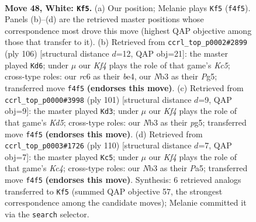 \documentclass[11pt]{article}
\begin{document}
\clearpage

\begin{figure}[p]\centering
\begin{subfigure}{0.46\textwidth}\centering
\resizebox{\linewidth}{!}{%
\newchessgame
\chessboard[
  setfen={5k2/2P5/2r5/4B3/5K2/1N6/8/8 w - - 9 48},
  showmover=false,
  pgfstyle=straightmove, color=movearrow, markmove={f4-f5}
]}
\caption{}
\end{subfigure}\hfill
\begin{subfigure}{0.46\textwidth}\centering
\resizebox{\linewidth}{!}{%
\newchessgame
\chessboard[
  setfen={4k3/8/8/2KP2P1/3Bb3/8/8/8 w - - 5 54},
  showmover=false,
  pgfstyle=straightmove, color=movearrow, markmove={c5-d6}
]}
\caption{}
\end{subfigure}
\\[4pt]
\begin{subfigure}{0.46\textwidth}\centering
\resizebox{\linewidth}{!}{%
\newchessgame
\chessboard[
  setfen={8/8/8/4b1P1/3kp2R/1K6/8/8 b - - 0 51},
  showmover=false,
  pgfstyle=straightmove, color=movearrow, markmove={d4-d3}
]}
\caption{}
\end{subfigure}\hfill
\begin{subfigure}{0.46\textwidth}\centering
\resizebox{\linewidth}{!}{%
\newchessgame
\chessboard[
  setfen={1k6/8/8/PP1B4/2K5/8/8/1r6 w - - 3 56},
  showmover=false,
  pgfstyle=straightmove, color=movearrow, markmove={c4-c5}
]}
\caption{}
\end{subfigure}
\caption{\textbf{Move 48, White: \texttt{Kf5}.} (a) Our position; Melanie plays \texttt{Kf5} (\texttt{f4f5}). Panels (b)--(d) are the retrieved master positions whose correspondence most drove this move (highest QAP objective among those that transfer to it). (b) Retrieved from \texttt{ccrl\_top\_p0002\#2899} (ply 106) [structural distance $d$=12, QAP obj=21]: the master played \texttt{Kd6}; under $\mu$ our \emph{Kf4} plays the role of that game's \emph{Kc5}; cross-type roles: our \emph{r}c6 as their \emph{b}e4, our \emph{N}b3 as their \emph{P}g5; transferred move \texttt{f4f5} \textbf{(endorses this move)}. (c) Retrieved from \texttt{ccrl\_top\_p0000\#3998} (ply 101) [structural distance $d$=9, QAP obj=9]: the master played \texttt{Kd3}; under $\mu$ our \emph{Kf4} plays the role of that game's \emph{Kd5}; cross-type roles: our \emph{N}b3 as their \emph{p}g5; transferred move \texttt{f4f5} \textbf{(endorses this move)}. (d) Retrieved from \texttt{ccrl\_top\_p0003\#1726} (ply 110) [structural distance $d$=7, QAP obj=7]: the master played \texttt{Kc5}; under $\mu$ our \emph{Kf4} plays the role of that game's \emph{Kc4}; cross-type roles: our \emph{N}b3 as their \emph{P}a5; transferred move \texttt{f4f5} \textbf{(endorses this move)}. Synthesis: 6 retrieved analogs transferred to \texttt{Kf5} (summed QAP objective 57, the strongest correspondence among the candidate moves); Melanie committed it via the \texttt{search} selector.}
\label{fig:thought-m94}
\end{figure}
\end{document}
